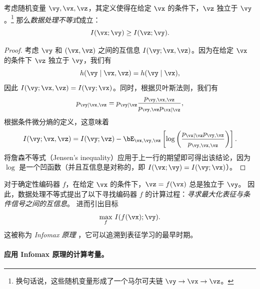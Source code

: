 \documentclass[../../book-main_zh.tex]{subfiles}
\begin{document}
\begin{theorem}[数据处理不等式]\label{thm:dpi}
    考虑随机变量 $\vy, \vx, \vz$，其定义使得在给定 $\vx$ 的条件下，$\vz$ 独立于 $\vy$。\footnote{换句话说，这些随机变量形成了一个马尔可夫链 $\vy \to \vx \to \vz$。} 那么\textit{数据处理不等式}成立：
    \begin{equation}\label{eq:dpi-ch7}
        I(\vx; \vy) \geq I(\vz; \vy).
    \end{equation}
    \begin{proof}
        考虑 $\vy$ 和 $(\vx, \vz)$ 之间的互信息 $I(\vy; \vx, \vz)$。因为在给定 $\vx$ 的条件下 $\vz$ 独立于 $\vy$，我们有
        \begin{equation*}
            h(\vy \mid \vx, \vz) = h(\vy \mid \vx),
        \end{equation*}
        因此 $I(\vy; \vx, \vz) = I(\vy; \vx)$。同时，根据贝叶斯法则，我们有
        \begin{equation*}
            p_{\vy \mid \vx, \vz} = p_{\vy \mid \vz}
            \frac{p_{\vy, \vx, \vz}}{p_{\vy, \vz} p_{\vx \mid \vz}},
        \end{equation*}
        根据条件微分熵的定义，这意味着
        \begin{equation*}
            I(\vy; \vx, \vz) =
            I(\vy; \vz)
            - \bE_{\vx, \vy, \vz}\left[ \log \left(
                    \frac{p_{\vx \mid \vz} p_{\vy, \vz}}{p_{\vy, \vx, \vz}}
            \right)\right].
        \end{equation*}
        将詹森不等式（Jensen's inequality）应用于上一行的期望即可得出该结论，因为 $\log$ 是一个凹函数（并且互信息是对称的，即 $I(\vx; \vy) = I(\vy; \vx)$）。
    \end{proof}
\end{theorem}

对于确定性编码器 $f$，在给定 $\vx$ 的条件下，$\vz = f(\vx)$ 总是独立于 $\vy$。
因此，数据处理不等式提出了以下寻找编码器 $f$ 的计算过程：\textit{寻求最大化表征与条件信号之间的互信息}。
 进而引出目标
\begin{equation}\label{eq:infomax-x}
    \max_{f}\, I(f(\vx); \vy).
\end{equation}
这被称为 \textit{Infomax 原理} \cite{infomax}，它可以追溯到表征学习的最早时期。

\paragraph{应用 Infomax 原理的计算考量。}
\end{document}
